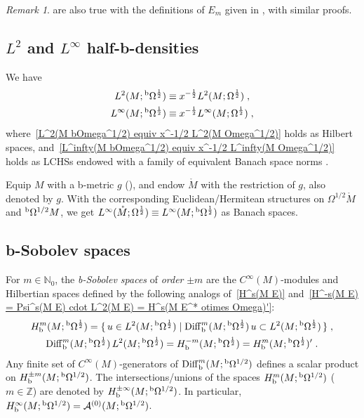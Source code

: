\documentclass{memo-l}
\theoremstyle{plain}
\theoremstyle{definition}
\theoremstyle{remark}
\newtheorem{rem}[thm]{Remark}
\newcommand{\N}{\mathbb{N}}
\newcommand{\Z}{\mathbb{Z}}
\renewcommand{\AA}{\mathcal{A}}
\newcommand{\Diff}{\operatorname{Diff}}
\newcommand{\bOmega}{{}^{\text{\rm b}}\Omega}
\newcommand{\Diffb}{\Diff_{\text{\rm b}}}
\newcommand{\Hb}{H_{\text{\rm b}}}
\numberwithin{section}{chapter}
\numberwithin{equation}{section}%
\begin{document}
\begin{rem}\label{r: E_m s - variants of the defn}
 are also true with the definitions of $E_m$ given in , with similar proofs.
\end{rem}



\subsection{$L^2$ and $L^\infty$ half-b-densities}\label{ss: L^2 and L^infty and L^infty half-b-densities}

We have 
\begin{align}
L^2(M;\bOmega^{\frac12})&\equiv x^{-\frac12}L^2(M;\Omega^{\frac12})\;,
\label{L^2(M bOmega^1/2) equiv x^-1/2 L^2(M Omega^1/2)}\\
L^\infty(M;\bOmega^{\frac12})&\equiv x^{-\frac12}L^\infty(M;\Omega^{\frac12})\;,
\label{L^infty(M bOmega^1/2) equiv x^-1/2 L^infty(M Omega^1/2)}
\end{align}
where~\eqref{L^2(M bOmega^1/2) equiv x^-1/2 L^2(M Omega^1/2)} holds as Hilbert spaces, and~\eqref{L^infty(M bOmega^1/2) equiv x^-1/2 L^infty(M Omega^1/2)} holds as LCHSs endowed with a family of equivalent Banach space norms \cite[Eqs.~(6.51) and~(6.52)]{AlvKordyLeichtnam-conormal}.

Equip $M$ with a b-metric $g$ (), and endow $\mathring M$ with the restriction of $g$, also denoted by $g$. With the corresponding Euclidean/Hermitean structures on $\Omega^{1/2}\mathring M$ and $\bOmega^{1/2}M$, we get $L^\infty(\mathring M;\Omega^{\frac12})\equiv L^\infty(M;\bOmega^{\frac12})$ as Banach spaces.


\subsection{b-Sobolev spaces}\label{ss: b-Sobolev}

For $m\in\N_0$, the \emph{b-Sobolev spaces}  of \emph{order} $\pm m$ are the $C^\infty(M)$-modules and Hilbertian spaces defined by the following analogs of~\eqref{H^s(M E)} and~\eqref{H^-s(M E) = Psi^s(M E) cdot L^2(M E) = H^s(M E^* otimes Omega)'}: \index{$\Hb^m(M;\bOmega^{\frac12})$}
\begin{gather*}
\Hb^m(M;\bOmega^{\frac12})=\{\,u\in L^2(M;\bOmega^{\frac12})\mid
\Diffb^m(M;\bOmega^{\frac12})\,u\subset L^2(M;\bOmega^{\frac12})\,\}\;,\\
\Diffb^m(M;\bOmega^{\frac12})\,L^2(M;\bOmega^{\frac12})=\Hb^{-m}(M;\bOmega^{\frac12})
= \Hb^m(M;\bOmega^{\frac12})'\;.
\end{gather*}
Any finite set of $C^\infty(M)$-generators of $\Diffb^m(M;\bOmega^{1/2})$ defines a scalar product on $\Hb^{\pm m}(M;\bOmega^{1/2})$. The intersections/unions of the spaces $\Hb^m(M;\bOmega^{1/2})$ ($m\in\Z$) are denoted by $\Hb^{\pm\infty}(M;\bOmega^{1/2})$. In particular, $\Hb^\infty(M;\bOmega^{1/2})=\AA^{(0)}(M;\bOmega^{1/2})$.
\end{document}
